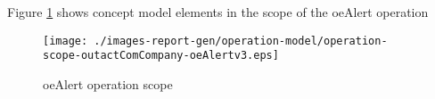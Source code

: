 Figure \ref{fig:lu.uni.lassy.excalibur.examples.icrash-OM-scopeView-operation-scope-outactComCompany-oeAlertv3}
shows concept model elements in the scope of the oeAlert operation

\begin{figure}[htbp]
\begin{center}

\texttt{[image: ./images-report-gen/operation-model/operation-scope-outactComCompany-oeAlertv3.eps]}
\end{center}
\caption[lu.uni.lassy.excalibur.examples.icrash Operation Scope: operation-scope-outactComCompany-oeAlertv3]{oeAlert operation scope
}
\label{fig:lu.uni.lassy.excalibur.examples.icrash-OM-scopeView-operation-scope-outactComCompany-oeAlertv3}
\end{figure}
\vspace{0.5cm}

